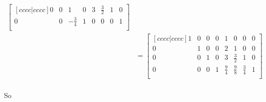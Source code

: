 \documentclass[12pt,letterpaper]{article}
\begin{document}
\begin{enumerate}
\begin{enumerate}
\begin{enumerate}[label=(\alph*)]
\begin{align*}
\begin{bmatrix}[c c c c | c c c c]
                   0            &  0            &  1            &  0 &  3 &  \frac{3}{2} &  1 &  0 \\
                   0            &  0            &  -\frac{3}{4} &  1 &  0 &  0           &  0 &  1 \\
                \end{bmatrix}
                \\
                &=
                \begin{bmatrix}[c c c c | c c c c]
                   1            &  0            &  0            &  0 &  1           &  0           &  0           &  0 \\
                   0            &  1            &  0            &  0 &  2           &  1           &  0           &  0 \\
                   0            &  0            &  1            &  0 &  3           &  \frac{3}{2} &  1           &  0 \\
                   0            &  0            &  0            &  1 &  \frac{9}{4} &  \frac{9}{8} &  \frac{3}{4} &  1 \\
                \end{bmatrix}
                \\
              \end{align*}

              So


\end{enumerate}
\end{enumerate}
\end{enumerate}
\end{document}
